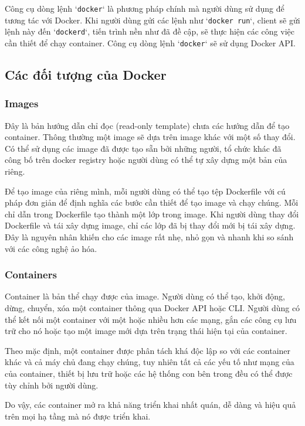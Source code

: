 Công cụ dòng lệnh `\texttt{docker}` là phương pháp chính mà người dùng sử dụng để tương tác với Docker. Khi người dùng gửi các lệnh như `\texttt{docker run}`, client sẽ gửi lệnh này đến `\texttt{dockerd}`, tiến trình nền như đã đề cập, sẽ thực hiện các công việc cần thiết để chạy container. Công cụ dòng lệnh `\texttt{docker}` sẽ sử dụng Docker API.

\subsection{Các đối tượng của Docker}

\subsubsection{Images}

Đây là bản hướng dẫn chỉ đọc (read-only template) chưa các hướng dẫn để tạo container. Thông thường một image sẽ dựa trên image khác với một số thay đổi. Có thể sử dụng các image đã được tạo sẵn bởi những người, tổ chức khác đã công bố trên docker registry hoặc người dùng có thể tự xây dựng một bản của riêng.

Để tạo image của riêng mình, mỗi người dùng có thể tạo tệp Dockerfile với cú pháp đơn giản để định nghĩa các bước cần thiết để tạo image và chạy chúng. Mỗi chỉ dẫn trong Dockerfile tạo thành một lớp trong image. Khi người dùng thay đổi Dockerfile và tái xây dựng image, chỉ các lớp đã bị thay đổi mới bị tái xây dựng. Đây là nguyên nhân khiến cho các image rất nhẹ, nhỏ gọn và nhanh khi so sánh với các công nghệ ảo hóa.

\subsubsection{Containers}

Container là bản thể chạy được của image. Người dùng có thể tạo, khởi động, dừng, chuyển, xóa một container thông qua Docker API hoặc CLI. Người dùng có thể kết nối một container với một hoặc nhiều hơn các mạng, gắn các công cụ lưu trữ cho nó hoặc tạo một image mới dựa trên trạng thái hiện tại của container.

Theo mặc định, một container được phân tách khá độc lập so với các container khác và cả máy chủ đang chạy chúng, tuy nhiên tất cả các yếu tố như mạng của của container, thiết bị lưu trữ hoặc các hệ thống con bên trong đều có thể được tùy chỉnh bởi người dùng.

Do vậy, các container mở ra khả năng triển khai nhất quán, dễ dàng và hiệu quả trên mọi hạ tầng mà nó được triển khai.